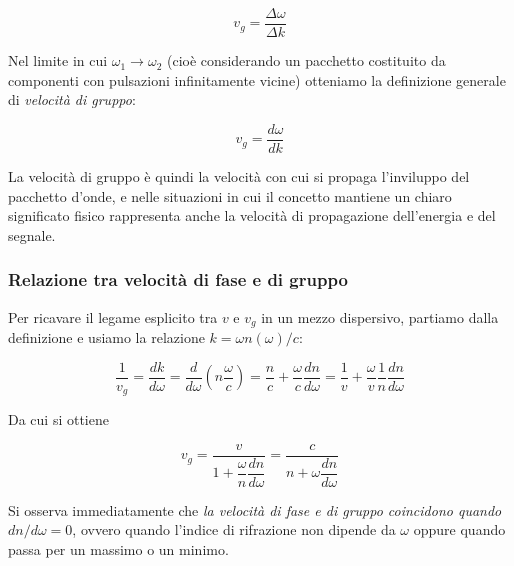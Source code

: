 \begin{equation}
    v_g = \frac{\Delta\omega}{\Delta k}
\end{equation}

Nel limite in cui $\omega_1 \to \omega_2$ (cioè considerando un pacchetto costituito da componenti con pulsazioni infinitamente vicine) otteniamo la definizione generale di \emph{velocità di gruppo}:

\begin{tcolorbox}[colback=yellow!10!white, colframe=orange!70!black, boxrule=0.8pt]
\begin{equation}
    v_g = \frac{d\omega}{dk}
\end{equation}
\end{tcolorbox}

La velocità di gruppo è quindi la velocità con cui si propaga l'inviluppo del pacchetto d'onde, e nelle situazioni in cui il concetto mantiene un chiaro significato fisico rappresenta anche la velocità di propagazione dell'energia e del segnale.\\

\subsubsection*{Relazione tra velocità di fase e di gruppo}

Per ricavare il legame esplicito tra $v$ e $v_g$ in un mezzo dispersivo, partiamo dalla definizione e usiamo la relazione $k = \omega n(\omega)/c$:

\begin{equation}
    \frac{1}{v_g} = \frac{dk}{d\omega} = \frac{d}{d\omega} \left( n\frac{\omega}{c} \right) = \frac{n}{c} + \frac{\omega}{c} \frac{dn}{d\omega} = \frac{1}{v} + \frac{\omega}{v} \frac{1}{n} \frac{dn}{d\omega}
\end{equation}

Da cui si ottiene

\begin{tcolorbox}[colback=yellow!10!white, colframe=orange!70!black, boxrule=0.8pt]
\begin{equation}
    v_g = \frac{v}{1 + \dfrac{\omega}{n}\dfrac{dn}{d\omega}} = \frac{c}{n + \omega \dfrac{dn}{d\omega}}
\end{equation}
\end{tcolorbox}

Si osserva immediatamente che \emph{la velocità di fase e di gruppo coincidono quando $dn/d\omega = 0$}, ovvero quando l'indice di rifrazione non dipende da $\omega$ oppure quando passa per un massimo o un minimo. 

